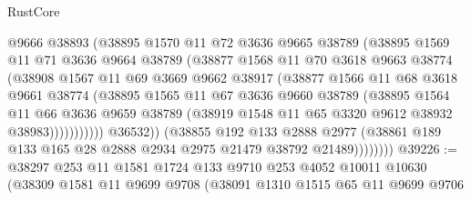 \begin{lexlean}{RustCore}
\begin{coremodule}
                          @9666
                          @38893
                          (@38895
                            @1570
                            @11
                            @72
                            @3636
                            @9665
                            @38789
                            (@38895
                              @1569
                              @11
                              @71
                              @3636
                              @9664
                              @38789
                              (@38877
                                @1568
                                @11
                                @70
                                @3618
                                @9663
                                @38774
                                (@38908
                                  @1567
                                  @11
                                  @69
                                  @3669
                                  @9662
                                  @38917
                                  (@38877
                                    @1566
                                    @11
                                    @68
                                    @3618
                                    @9661
                                    @38774
                                    (@38895
                                      @1565
                                      @11
                                      @67
                                      @3636
                                      @9660
                                      @38789
                                      (@38895
                                        @1564
                                        @11
                                        @66
                                        @3636
                                        @9659
                                        @38789
                                        (@38919 @1548 @11 @65 @3320 @9612 @38932 @38983)))))))))))
                    @36532))
                (@38855
                  @192
                  @133
                  @2888
                  @2977
                  (@38861 @189 @133 @165 @28 @2888 @2934 @2975 @21479 @38792 @21489))))))))
@39226 := @38297
    @253
    @11
    @1581
    @1724
    @133
    @9710
    @253
    @4052
    @10011
    @10630
    (@38309
      @1581
      @11
      @9699
      @9708
      (@38091
        @1310
        @1515
        @65
        @11
        @9699
        @9706

\end{coremodule}
\end{lexlean}
